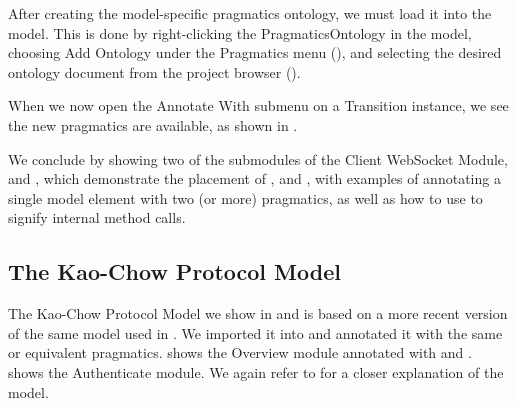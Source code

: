 After creating the model-specific pragmatics ontology, we must load it into the
model. This is done by right-clicking the PragmaticsOntology in the model,
choosing Add Ontology under the Pragmatics menu (), and
selecting the desired ontology document from the project browser
().



When we now open the Annotate With submenu on a Transition instance, we see the
new pragmatics are available, as shown in . 


We conclude by showing two of the submodules of the Client WebSocket Module,
 and , which
demonstrate the placement of ,  and
, with examples of annotating a single model element with two
(or more) pragmatics, as well as how to use  to signify
internal method calls.


\subsection{The Kao-Chow Protocol Model}

The Kao-Chow Protocol Model we show in  and
 is based on a more recent version of the same model
used in \cite{Simonsen2011}. We imported it into \thename{} and annotated it
with the same or equivalent pragmatics.  shows the Overview
module annotated with  and .
 shows the Authenticate module. We again refer to
\cite{Simonsen2011} for a closer explanation of the model.




